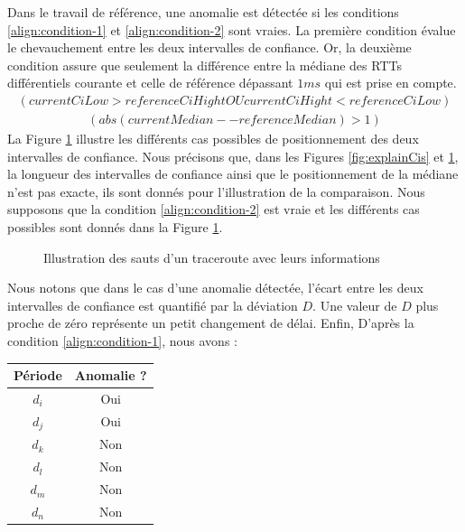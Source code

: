   Dans le travail de référence, une anomalie est détectée si les conditions \ref{align:condition-1} et \ref{align:condition-2} sont vraies. La première condition évalue le chevauchement entre les deux intervalles de confiance. Or, la deuxième condition assure que seulement la  différence entre la médiane des RTTs différentiels courante et celle de référence dépassant $1 ms$ qui est prise en compte.
\begin{align}
(currentCiLow > referenceCiHight OU  currentCiHight <  referenceCiLow) \label{align:condition-1}
\end{align}
\begin{align}
(abs(currentMedian -- referenceMedian) > 1 ) \label{align:condition-2}
\end{align}
La Figure \ref{fig:anomalies} illustre les différents cas possibles de positionnement des deux intervalles de confiance. Nous précisons que,  dans les Figures	\ref{fig:explainCis} et \ref{fig:anomalies},  la longueur des intervalles de confiance ainsi que le positionnement de la médiane n'est pas exacte, ils sont donnés pour l'illustration de la comparaison. Nous supposons que la condition \ref{align:condition-2} est vraie et les différents cas possibles sont donnés dans la Figure 	\ref{fig:anomalies}.

\begin{figure}[H]
	\centering
	\captionsetup{justification=centering}
	\resizebox{\textwidth}{!}{
		
	}
	\caption{Illustration des sauts d'un traceroute avec leurs informations}
	\label{fig:anomalies}
\end{figure}


Nous notons que dans le cas d'une anomalie détectée, l'écart entre les deux intervalles de confiance est quantifié par la déviation $D$. Une valeur de $D$ plus proche de zéro représente un petit changement de délai. Enfin, D'après la condition  \ref{align:condition-1}, nous avons :
\begin{table}[H]
	\centering
	\begin{tabular}{cc}
		\textbf{Période} & \textbf{Anomalie ?}\\ \hline
		$d_i$& Oui \\ \hline
		$d_j$ & Oui\\ \hline
		$d_k$& Non\\ \hline
		$d_l$& Non\\ \hline
		$d_m$ & Non \\ \hline
		$d_n$ & Non\\ \hline
	\end{tabular}
\end{table}



